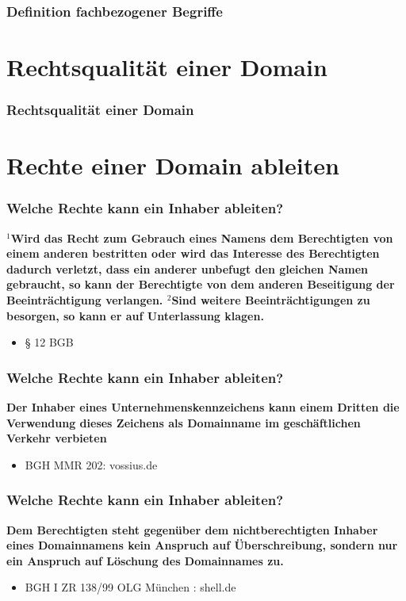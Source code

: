 \documentclass{beamer}
\begin{document}
	\begin{frame}
		\frametitle{Definition fachbezogener Begriffe}
		
	\end{frame}
	
	\section{Rechtsqualität einer Domain}
	
	\begin{frame}
		\frametitle{Rechtsqualität einer Domain}
		
	\end{frame}
	
	\section{Rechte einer Domain ableiten}
	
	\begin{frame}
		\frametitle{Welche Rechte kann ein Inhaber ableiten?}
		\textbf{$^1$Wird das Recht zum Gebrauch eines Namens dem Berechtigten von einem anderen bestritten oder wird das Interesse des Berechtigten dadurch verletzt, dass ein anderer unbefugt den gleichen Namen gebraucht, so kann der Berechtigte von dem anderen Beseitigung der Beeinträchtigung verlangen. $^2$Sind weitere Beeinträchtigungen zu besorgen, so kann er auf Unterlassung klagen.}
		\begin{itemize}
			\item § 12 BGB
		\end{itemize}
		
	\end{frame}
	
	\begin{frame}
		\frametitle{Welche Rechte kann ein Inhaber ableiten?}
		\textbf{Der Inhaber eines Unternehmenskennzeichens kann einem Dritten die Verwendung dieses Zeichens als Domainname im geschäftlichen Verkehr verbieten}
		\begin{itemize}
			\item BGH MMR 202: vossius.de
		\end{itemize}
		
	\end{frame}
	
	\begin{frame}
		\frametitle{Welche Rechte kann ein Inhaber ableiten?}
		\textbf{Dem Berechtigten steht gegenüber dem nichtberechtigten Inhaber eines Domainnamens kein Anspruch auf Überschreibung, sondern nur ein Anspruch auf Löschung des Domainnames zu.}
		\begin{itemize}
			\item BGH I ZR 138/99 OLG München : shell.de
		\end{itemize}
		
	\end{frame}
	
\end{document}
